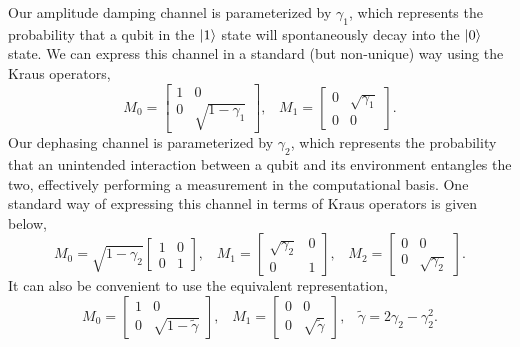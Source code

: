 \documentclass[
amsmath,
amssymb,
aps,
pra,
reprint,
twocolumn,
superscriptaddress,
longbibliography,
showkeys,
floatfix
]{revtex4-1}
\def\ket#1{\ensuremath{\mathinner{|{#1}\rangle}}}
\begin{document}
Our amplitude damping channel is parameterized by \(\gamma_1\), which represents
the probability that a qubit in the \(\ket{1}\) state will spontaneously decay
into the \(\ket{0}\) state. 
We can express this channel in a standard (but non-unique) way using the Kraus
operators,
\begin{equation}
  \label{eq:amp_damp}
  M_0 =
  \begin{bmatrix}
    1 & 0 \\
    0 & \sqrt{1 - \gamma_1}
  \end{bmatrix}, \;\;\;
  M_1 = 
  \begin{bmatrix}
    0 & \sqrt{\gamma_1} \\
    0 & 0
  \end{bmatrix}.
\end{equation}
Our dephasing channel is parameterized by \(\gamma_2\), which represents the
probability that an unintended interaction between a qubit and its environment
entangles the two, effectively performing a measurement in the
computational basis. One standard way of expressing this channel in terms of
Kraus operators is given below,
\begin{equation}
  \label{eq:dephasing}
  M_0 =
  \sqrt{1-\gamma_2}
  \begin{bmatrix}
    1 & 0 \\
    0 & 1
  \end{bmatrix}, \;\;\;
  M_1 = 
  \begin{bmatrix}
    \sqrt{\gamma_2} & 0 \\
    0 & 1
  \end{bmatrix}, \;\;\;
  M_2 = 
  \begin{bmatrix}
    0 & 0 \\
    0 & \sqrt{\gamma_2}
  \end{bmatrix}.
\end{equation}
It can also be convenient to use the equivalent representation,
\begin{equation}
  \label{eq:dephasing_cirq}
  M_0 =
  \begin{bmatrix}
    1 & 0 \\
    0 & \sqrt{1 - \tilde{\gamma}}
  \end{bmatrix}, \;\;\;
  M_1 = 
  \begin{bmatrix}
    0 & 0 \\
    0 & \sqrt{\tilde{\gamma}}
  \end{bmatrix}, \;\;\;
  \tilde{\gamma} = 2\gamma_2 - \gamma_2^2.
\end{equation}
\end{document}
